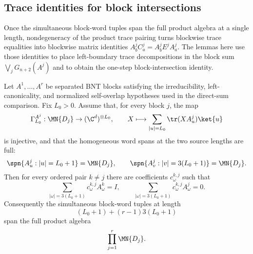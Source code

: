 \subsection{Trace identities for block intersections}\label{subsec:block_intersection_trace}

Once the simultaneous block-word tuples span the full product algebra at a single
length, nondegeneracy of the product trace pairing turns blockwise trace equalities
into blockwise matrix identities $A^j_bC^j_a=A^j_bE^jA^j_a$. The lemmas here use
those identities to place left-boundary trace decompositions in the block sum
$\bigvee_jG_{n+2}(A^j)$ and to obtain the one-step block-intersection identity.

\begin{lemma}
    \label{lem:bnt_direct_sum_block_separation_word_span}
    \leanok
    Let $A^1,\ldots,A^r$ be separated BNT blocks satisfying the
    irreducibility, left-canonicality, and normalized self-overlap hypotheses
    used in the direct-sum comparison. Fix $L_0>0$. Assume that, for every
    block $j$, the map
    \[
        \Gamma_{L_0}^{A^j}:\MN{D_j}\to
        (\C^d)^{\otimes L_0},
        \qquad
        X\longmapsto
        \sum_{|u|=L_0}\tr(XA^j_u)\ket{u}
    \]
    is injective, and that the homogeneous word spans at the two source
    lengths are full:
    \[
        \spn\{A^j_u:|u|=L_0+1\}=\MN{D_j},
        \qquad
        \spn\{A^j_v:|v|=3(L_0+1)\}=\MN{D_j}.
    \]
    Then for every ordered pair $k\ne j$ there are coefficients
    $c^{k,j}_\omega$ such that
    \[
        \sum_{|\omega|=3(L_0+1)} c^{k,j}_\omega A^k_\omega=I,
        \qquad
        \sum_{|\omega|=3(L_0+1)} c^{k,j}_\omega A^j_\omega=0.
    \]
    Consequently the simultaneous block-word tuples at length
    \[
        (L_0+1)+(r-1)3(L_0+1)
    \]
    span the full product algebra
    \[
        \prod_{j=1}^r \MN{D_j}.
    \]
\end{lemma}

